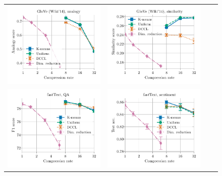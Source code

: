 \begin{figure}
\begin{tabular}{@{\hskip -0.0in}c@{\hskip -0.0in}c@{\hskip -0.0in}c@{\hskip -0.0in}c@{\hskip -0.0in}}
		\includegraphics[width=.245\linewidth]{figures/glove400k_intrinsics_google-mul_vs_compression_linx_det.pdf} &
		\includegraphics[width=.245\linewidth]{figures/glove400k_intrinsics_bruni_men_vs_compression_linx_det.pdf} \\
		\includegraphics[width=.245\linewidth]{figures/fasttext1m_qa_best-f1_vs_compression_linx_det.pdf} &
		\includegraphics[width=.245\linewidth]{figures/fasttext1m_sentiment_sst_test-acc_vs_compression_linx_det.pdf} &

\end{tabular}
\end{figure}
